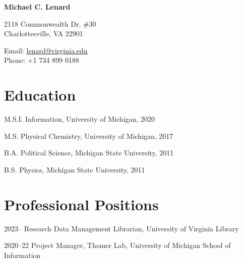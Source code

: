 \documentclass[12pt,letterpaper]{report}
\newcommand{\myname}{Michael C. Lenard}
\newcommand{\namefont}[1]{{\normalfont\bfseries\Huge{#1}}}
\begin{document}
 \raggedright

\namefont{\myname}

\vspace{1em}
\begin{minipage}[t]{0.68\textwidth}
        2118 Commonwealth Dr. \#30 \\
Charlottesville, VA 22901
\end{minipage}
\begin{minipage}[t]{0.31\textwidth}
        Email: \href{mailto:lenard@virginia.edu}{lenard@virginia.edu} \\
        Phone: +1 734 899 0188
\end{minipage}
\vspace{0.5em}



\section*{Education}

\begin{tablist}

	\item[M.S.I.] \tab Information, University of Michigan, 2020

	\item[M.S.]  \tab Physical Chemistry, University of Michigan, 2017

	\item[B.A.]  \tab Political Science, Michigan State University, 2011
        
	\item[B.S.]  \tab Physics, Michigan State University, 2011

\end{tablist}



\section*{Professional Positions}

\begin{tablist}

\item[2023--] \tab Research Data Management Librarian, University of Virginia Library

\item[2020--22] \tab Project Manager, Thomer Lab, University of Michigan School of Information

\end{tablist}
\end{document}
